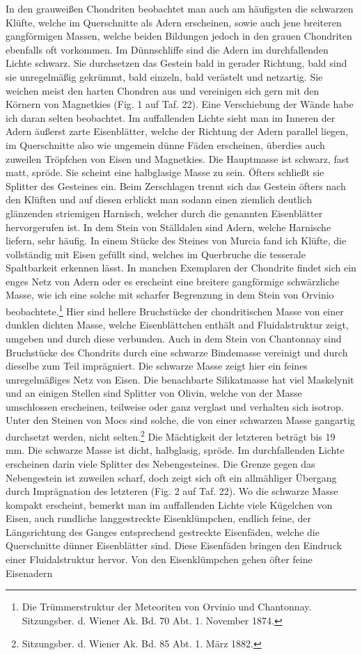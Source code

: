 \documentclass[a4paper, 11pt, oneside, polutonikogreek, german]{article}
\begin{document}
In den grauweißen Chondriten beobachtet man auch am häufigsten die schwarzen Klüfte, welche im Querschnitte als Adern erscheinen, sowie auch jene breiteren gangförmigen Massen, welche beiden Bildungen jedoch in den grauen Chondriten ebenfalls oft vorkommen. Im Dünnschliffe sind die Adern im durchfallenden Lichte schwarz. Sie durchsetzen das Gestein bald in gerader Richtung, bald sind sie unregelmäßig gekrümmt, bald einzeln, bald verästelt und netzartig. Sie weichen meist den harten Chondren aus und vereinigen sich gern mit den Körnern von Magnetkies (Fig. 1 auf Taf. 22). Eine Verschiebung der Wände habe ich daran selten beobachtet. Im auffallenden Lichte sieht man im Inneren der Adern äußerst zarte Eisenblätter, welche der Richtung der Adern parallel liegen, im Querschnitte also wie ungemein dünne Fäden erscheinen, überdies auch zuweilen Tröpfchen von Eisen und Magnetkies. Die Hauptmasse ist schwarz, fast matt, spröde. Sie scheint eine halbglasige Masse zu sein. Öfters schließt sie Splitter des Gesteines ein. Beim Zerschlagen trennt sich das Gestein öfters nach den Klüften und auf diesen erblickt man sodann einen ziemlich deutlich glänzenden striemigen Harnisch, welcher durch die genannten Eisenblätter hervorgerufen ist. In dem Stein von Ställdalen sind Adern, welche Harnische liefern, sehr häufig. In einem Stücke des Steines von Murcia fand ich Klüfte, die vollständig mit Eisen gefüllt sind, welches im Querbruche die tesserale Spaltbarkeit erkennen lässt. In manchen Exemplaren der Chondrite findet sich ein enges Netz von Adern oder es erscheint eine breitere gangförmige schwärzliche Masse, wie ich eine solche mit scharfer Begrenzung in dem Stein von Orvinio beobachtete.\footnote{Die Trümmerstruktur der Meteoriten von Orvinio und Chantonnay. Sitzungsber. d. Wiener Ak. Bd. 70 Abt. 1. November 1874.} Hier sind hellere Bruchstücke der chondritischen Masse von einer dunklen dichten Masse, welche Eisenblättchen enthält and Fluidalstruktur zeigt, umgeben und durch diese verbunden. Auch in dem Stein von Chantonnay sind Bruchstücke des Chondrits durch eine schwarze Bindemasse vereinigt und durch dieselbe zum Teil imprägniert. Die schwarze Masse zeigt hier ein feines unregelmäßiges Netz von Eisen. Die benachbarte Silikatmasse hat viel Maskelynit und an einigen Stellen sind Splitter von Olivin, welche von der Masse umschlossen erscheinen, teilweise oder ganz verglast und verhalten sich isotrop. Unter den Steinen von Mocs sind solche, die von einer schwarzen Masse gangartig durchsetzt werden, nicht selten.\footnote{Sitzungsber. d. Wiener Ak. Bd. 85 Abt. 1. März 1882.} Die Mächtigkeit der letzteren beträgt bis 19 mm. Die schwarze Masse ist dicht, halbglasig, spröde. Im durchfallenden Lichte erscheinen darin viele Splitter des Nebengesteines. Die Grenze gegen das Nebengestein ist zuweilen scharf, doch zeigt sich oft ein allmähliger Übergang durch Imprägnation des letzteren (Fig. 2 auf Taf. 22). Wo die schwarze Masse kompakt erscheint, bemerkt man im auffallenden Lichte viele Kügelchen von Eisen, auch rundliche langgestreckte Eisenklümpchen, endlich feine, der Längsrichtung des Ganges entsprechend gestreckte Eisenfäden, welche die Querschnitte dünner Eisenblätter sind. Diese Eisenfäden bringen den Eindruck einer Fluidalstruktur hervor. Von den Eisenklümpchen gehen öfter feine Eisenadern 
\end{document}
